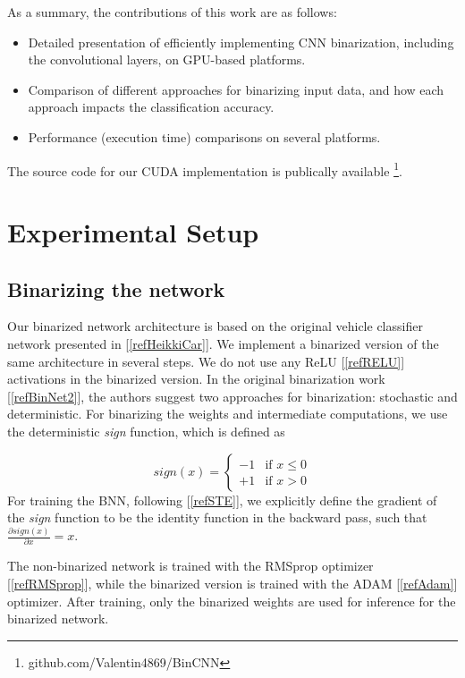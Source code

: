 \documentclass[conference,compsoc]{IEEEtran}
\newcommand{\jani}[1]{\textcolor{red}{\textbf{[Jani: #1]}}}
\begin{document}
As a summary, the contributions of this work are as follows:
\vspace{-0.8mm}
\begin{itemize}
	\item Detailed presentation of efficiently implementing
CNN binarization, including the convolutional layers,
on GPU-based platforms.
    \item Comparison of different approaches for binarizing
input data, and how each approach impacts the classification
accuracy.
    \item Performance (execution time) comparisons on several
platforms.
    
\end{itemize}

The source code for our CUDA implementation is publically available \footnote{ github.com/Valentin4869/BinCNN}{}.

\section{Experimental Setup}
\subsection{Binarizing the network}
Our binarized network architecture is based on the original vehicle classifier network presented in [\ref{refHeikkiCar}]. We implement a binarized version of the same architecture in several steps. We do not use any ReLU [\ref{refRELU}] activations in the binarized version. In the original binarization work [\ref{refBinNet2}], the authors suggest two approaches for binarization: stochastic and deterministic. For binarizing the weights and intermediate computations, we use the deterministic \textit{sign} function, which is defined as


\begin{equation}
sign(x) = \begin{cases} -1 & \text{if } x \leq 0 \\ +1 & \text{if } x > 0 \end{cases}
\end{equation}
For training the BNN, following [\ref{refSTE}], we explicitly define the gradient of the \textit{sign} function to be the identity function in the backward pass, such that $\frac{\partial sign(x)}{\partial x} = x$.


The non-binarized network is trained with the RMSprop optimizer [\ref{refRMSprop}], while the binarized version is trained with the ADAM [\ref{refAdam}] optimizer.  After training, only the binarized weights are used for inference for the binarized network.
\end{document}
